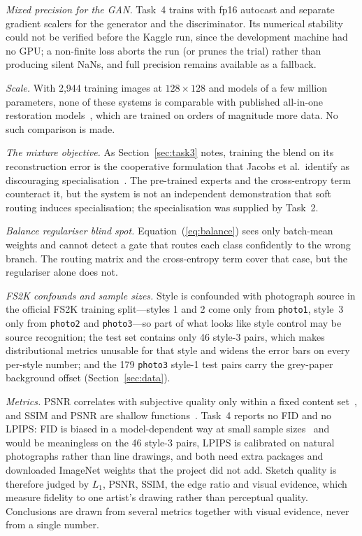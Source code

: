 \documentclass[conference]{IEEEtran}
\begin{document}

\emph{Mixed precision for the GAN.} Task~4 trains with fp16 autocast and separate
gradient scalers for the generator and the discriminator. Its numerical
stability could not be verified before the Kaggle run, since the development
machine had no GPU; a non-finite loss aborts the run (or prunes the trial) rather
than producing silent NaNs, and full precision remains available as a fallback.


\emph{Scale.} With 2{,}944 training images at $128 \times 128$ and models of a
few million parameters, none of these systems is comparable with published
all-in-one restoration models~\cite{li2022allinone,potlapalli2023promptir}, which
are trained on orders of magnitude more data. No such comparison is made.

\emph{The mixture objective.} As Section~\ref{sec:task3} notes, training the
blend on its reconstruction error is the cooperative formulation that Jacobs et
al.\ identify as discouraging specialisation~\cite{jacobs1991adaptive}. The
pre-trained experts and the cross-entropy term counteract it, but the system is
not an independent demonstration that soft routing induces specialisation; the
specialisation was supplied by Task~2.

\emph{Balance regulariser blind spot.} Equation~(\ref{eq:balance}) sees only
batch-mean weights and cannot detect a gate that routes each class confidently to
the wrong branch. The routing matrix and the cross-entropy term cover that case,
but the regulariser alone does not.

\emph{FS2K confounds and sample sizes.} Style is confounded with photograph
source in the official FS2K training split---styles 1 and 2 come only from
\texttt{photo1}, style~3 only from \texttt{photo2} and \texttt{photo3}---so part
of what looks like style control may be source recognition; the test set
contains only 46 style-3 pairs, which makes distributional metrics unusable for
that style and widens the error bars on every per-style number; and the 179
\texttt{photo3} style-1 test pairs carry the grey-paper background offset
(Section~\ref{sec:data}).

\emph{Metrics.} PSNR correlates with subjective quality only within a fixed
content set~\cite{huynh2008scope}, and SSIM and PSNR are shallow
functions~\cite{zhang2018unreasonable}. Task~4 reports no FID and no LPIPS: FID is
biased in a model-dependent way at small sample sizes~\cite{chong2020effectively}
and would be meaningless on the 46 style-3 pairs, LPIPS is calibrated on natural
photographs rather than line drawings, and both need extra packages and
downloaded ImageNet weights that the project did not add. Sketch quality is
therefore judged by $L_1$, PSNR, SSIM, the edge ratio and visual evidence, which
measure fidelity to one artist's drawing rather than perceptual quality.
Conclusions are drawn from several metrics together with visual evidence, never
from a single number.
\end{document}
